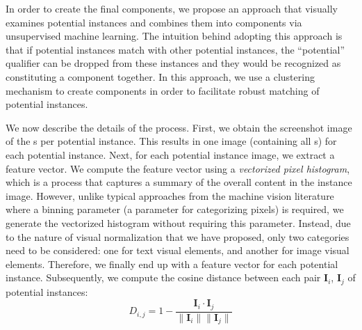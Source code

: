 In order to create the final components,
we propose an approach that visually examines potential instances and combines them into components via unsupervised machine learning.
The intuition behind adopting this approach is that if potential instances match with other potential instances,
the ``potential'' qualifier can be dropped from these instances and they would be recognized as constituting a component together.
In this approach, we use a clustering mechanism to create components in order to facilitate robust matching of potential instances.

We now describe the details of the process. First, we obtain the screenshot image of the {\VizElem}s per potential instance. This results in one image (containing all {\VizElem}s) for each potential instance. Next, for each potential instance image, we extract a feature vector. We compute the feature vector using a \emph{vectorized pixel histogram}, which is a process that captures a summary of the overall content in the instance image. However, unlike typical approaches from the machine vision literature~\cite{lopes2010automatic, liu2010image} where a binning parameter (a parameter for categorizing pixels) is required, we generate the vectorized histogram without requiring this parameter. Instead, due to the nature of visual normalization that we have proposed, only two categories need to be considered: one for text visual elements, and another for image visual elements. Therefore, we finally end up with a feature vector for each potential instance. Subsequently, we compute the cosine distance between each pair $\mathbf{I}_i$, $\mathbf{I}_j$ of potential instances:
\begin{equation} \label{eqn:cosdist}
D_{i,j} = 1 - \frac{\mathbf{I}_i \cdot \mathbf{I}_j}{ \lVert \mathbf{I}_i \rVert \lVert \mathbf{I}_j \rVert }
\end{equation}

